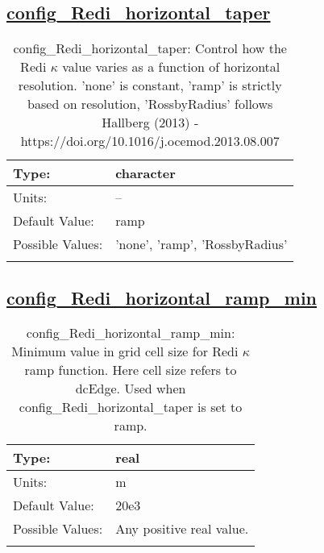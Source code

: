 \subsection[config\_Redi\_horizontal\_taper]{\hyperref[sec:nm_tab_Redi_isopycnal_mixing]{config\_Redi\_horizontal\_taper}}
\label{subsec:nm_sec_config_Redi_horizontal_taper}
\begin{center}
\begin{longtable}{| p{2.0in} || p{4.0in} |}
    \hline
    Type: & character \\
    \hline
    Units: & -- \\
    \hline
    Default Value: & ramp \\
    \hline
    Possible Values: & 'none', 'ramp', 'RossbyRadius' \\
    \hline
    \caption{config\_Redi\_horizontal\_taper: Control how the Redi $\kappa$ value varies as a function of horizontal resolution. 'none' is constant, 'ramp' is strictly based on resolution, 'RossbyRadius' follows Hallberg (2013) - https://doi.org/10.1016/j.ocemod.2013.08.007}
\end{longtable}
\end{center}
\subsection[config\_Redi\_horizontal\_ramp\_min]{\hyperref[sec:nm_tab_Redi_isopycnal_mixing]{config\_Redi\_horizontal\_ramp\_min}}
\label{subsec:nm_sec_config_Redi_horizontal_ramp_min}
\begin{center}
\begin{longtable}{| p{2.0in} || p{4.0in} |}
    \hline
    Type: & real \\
    \hline
    Units: & \si{m} \\
    \hline
    Default Value: & 20e3 \\
    \hline
    Possible Values: & Any positive real value. \\
    \hline
    \caption{config\_Redi\_horizontal\_ramp\_min: Minimum value in grid cell size for Redi $\kappa$ ramp function.  Here cell size refers to dcEdge. Used when config\_Redi\_horizontal\_taper is set to ramp.}
\end{longtable}
\end{center}
